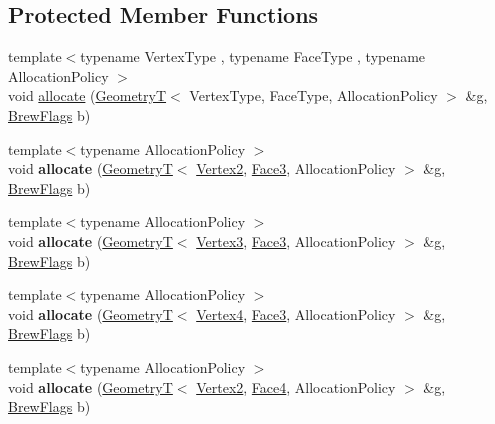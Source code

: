 \subsection*{Protected Member Functions}
\begin{DoxyCompactItemize}
\item 
{\footnotesize template$<$typename Vertex\-Type , typename Face\-Type , typename Allocation\-Policy $>$ }\\void \hyperlink{classs9_1_1gl_1_1Drawable_ad9c83ff9377dfd128a32e2bb005d257f}{allocate} (\hyperlink{classs9_1_1GeometryT}{Geometry\-T}$<$ Vertex\-Type, Face\-Type, Allocation\-Policy $>$ \&g, \hyperlink{structs9_1_1gl_1_1BrewFlags}{Brew\-Flags} b)
\item 
\hypertarget{classs9_1_1gl_1_1Drawable_a262ce388ff43ede822f61c96272c7747}{{\footnotesize template$<$typename Allocation\-Policy $>$ }\\void {\bfseries allocate} (\hyperlink{classs9_1_1GeometryT}{Geometry\-T}$<$ \hyperlink{structs9_1_1VertexT}{Vertex2}, \hyperlink{structs9_1_1FaceT}{Face3}, Allocation\-Policy $>$ \&g, \hyperlink{structs9_1_1gl_1_1BrewFlags}{Brew\-Flags} b)}\label{classs9_1_1gl_1_1Drawable_a262ce388ff43ede822f61c96272c7747}

\item 
\hypertarget{classs9_1_1gl_1_1Drawable_a4489c6f70638b5d75558349225cd43a8}{{\footnotesize template$<$typename Allocation\-Policy $>$ }\\void {\bfseries allocate} (\hyperlink{classs9_1_1GeometryT}{Geometry\-T}$<$ \hyperlink{structs9_1_1VertexT}{Vertex3}, \hyperlink{structs9_1_1FaceT}{Face3}, Allocation\-Policy $>$ \&g, \hyperlink{structs9_1_1gl_1_1BrewFlags}{Brew\-Flags} b)}\label{classs9_1_1gl_1_1Drawable_a4489c6f70638b5d75558349225cd43a8}

\item 
\hypertarget{classs9_1_1gl_1_1Drawable_a17ad8176a4295ec65e12ef4bb316581a}{{\footnotesize template$<$typename Allocation\-Policy $>$ }\\void {\bfseries allocate} (\hyperlink{classs9_1_1GeometryT}{Geometry\-T}$<$ \hyperlink{structs9_1_1VertexT}{Vertex4}, \hyperlink{structs9_1_1FaceT}{Face3}, Allocation\-Policy $>$ \&g, \hyperlink{structs9_1_1gl_1_1BrewFlags}{Brew\-Flags} b)}\label{classs9_1_1gl_1_1Drawable_a17ad8176a4295ec65e12ef4bb316581a}

\item 
\hypertarget{classs9_1_1gl_1_1Drawable_ac984e096084672fd0ffcef1560ab8b11}{{\footnotesize template$<$typename Allocation\-Policy $>$ }\\void {\bfseries allocate} (\hyperlink{classs9_1_1GeometryT}{Geometry\-T}$<$ \hyperlink{structs9_1_1VertexT}{Vertex2}, \hyperlink{structs9_1_1FaceT}{Face4}, Allocation\-Policy $>$ \&g, \hyperlink{structs9_1_1gl_1_1BrewFlags}{Brew\-Flags} b)}\label{classs9_1_1gl_1_1Drawable_ac984e096084672fd0ffcef1560ab8b11}


\end{DoxyCompactItemize}
